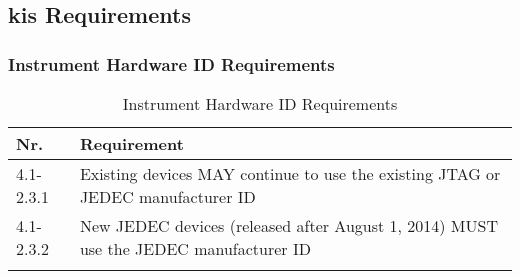 \newcommand*{\tabletype}{longtable}

\subsection[KIS Requirements]{\acrshort{kis} Requirements }\label{app:anhang_kis_requirements}
\subsubsection{Instrument Hardware ID Requirements}
\begin{\tabletype}[H]{|p{.12\linewidth}|p{.83\linewidth}|}
\hline
\textbf{Nr.} & \textbf{Requirement} \\ \hline 
\endhead 
4.1-2.3.1 & Existing  devices MAY continue to use the existing JTAG or JEDEC manufacturer ID \\ \hline 
4.1-2.3.2 & New  JEDEC devices (released after August 1, 2014) MUST use the  JEDEC manufacturer ID \\ \hline 
\caption {Instrument Hardware ID Requirements}
\label{tab:InstrumentHardwareIDRequirementsList}
\end{\tabletype}
